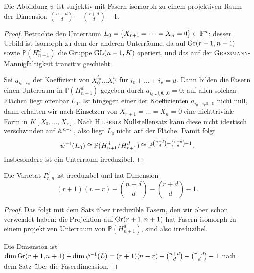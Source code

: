 \begin{prop}
Die Abbildung $\psi$ ist surjektiv mit Fasern isomorph zu einem projektiven Raum der Dimension $\binom{n+d}d - \binom{r+d}d - 1$.
\end{prop}
\begin{proof}
Betrachte den Unterraum $L_0 = \{X_{r+1} = \dots = X_n = 0\} \subset \mathbb P^{n}$: dessen Urbild ist isomorph zu dem der anderen Unterräume, da auf $\grass r+1/{n+1}$ sowie $\mathbb P(H_{n+1}^d)$ die Gruppe $\mathrm{GL}(n+1,K)$ operiert, und das auf der \textsc{Grassmann}-Mannigfaltigkeit transitiv geschieht.

Sei $a_{i_0 \dots i_n}$ der Koeffizient von $X_0^{i_0} \dots X_n^{i_n}$ für $i_0 + \dots + i_n = d$. Dann bilden die Fasern einen Unterraum in $\mathbb P(H_{n+1}^d)$ gegeben durch $a_{i_0 \dots i_r 0 \dots 0} = 0$: auf allen solchen Flächen liegt offenbar $L_0$. Ist hingegen einer der Koeffizienten $a_{i_0 \dots i_r 0 \dots 0}$ nicht null, dann erhalten wir nach Einsetzen von $X_{r+1} = \dots = X_n = 0$ eine nichttriviale Form in $K[X_0, \dots, X_r]$. Nach \textsc{Hilbert}s Nullstellensatz kann diese nicht identisch verschwinden auf $\mathbb A^{n-r}$, also liegt $L_0$ nicht auf der Fläche. Damit folgt
\begin{equation*}
\psi^{-1}(L_0) \cong \mathbb P(H_{n+1}^d / H_{r+1}^d) \cong \mathbb P^{\binom{n+d}d - \binom{r+d}d - 1}.
\end{equation*}
Insbesondere ist ein Unterraum irreduzibel.
\end{proof}

\begin{coroll}
Die Varietät $\Gamma_{r,n}^d$ ist irreduzibel und hat Dimension
\begin{equation}
(r+1)(n-r) + \binom{n+d}d - \binom{r+d}d - 1.
\end{equation}
\end{coroll}
\begin{proof}
Das folgt mit dem Satz über irreduzible Fasern, den wir oben schon verwendet haben: die Projektion auf $\grass r+1/{n+1}$ hat Fasern isomorph zu einem projektiven Unterraum von $\mathbb P(H_{n+1}^d)$, sind also irreduzibel.

Die Dimension ist $\dim \grass r+1/{n+1} + \dim \psi^{-1}(L) = (r+1)(n-r) + \binom{n+d}d - \binom{r+d}d - 1$ nach dem Satz über die Faserdimension.
\end{proof}

